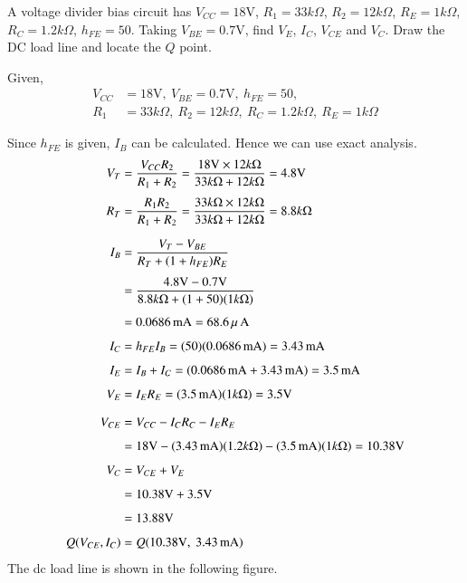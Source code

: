 \begin{example}\label{exam4.16}
A voltage divider bias circuit has $V_{CC}=18\text{V}$, $R_{1}=33 k\Omega$, $R_{2}=12 k\Omega$, $R_{E}=1 k\Omega$, $R_{C}=1.2 k\Omega$, $h_{FE}=50$. Taking $V_{BE}=0.7\text{V}$, find $V_{E}$, $I_{C}$, $V_{CE}$ and $V_{C}$. Draw the DC load line and locate the $Q$ point.
\end{example}

\begin{solution}
Given,
\begin{align*}
V_{CC} &= 18\text{V}, \ V_{BE}=0.7\text{V}, \ h_{FE}=50,\\[3pt]
R_{1} &= 33 k\Omega, \ R_{2}=12 k\Omega, \ R_{C}=1.2 k\Omega, \ R_{E}=1 k\Omega
\end{align*}

Since $h_{FE}$ is given, $I_{B}$ can be calculated. Hence we can use exact analysis.
\begin{align*}
V_{T} &= \frac{V_{CC}R_{2}}{R_{1}+R_{2}}=\frac{18\text{V}\times 12 k\Omega}{33 k\Omega +12 k\Omega}=4.8\text{V}\\[4pt]
R_{T} &= \frac{R_{1}R_{2}}{R_{1}+R_{2}}=\frac{33 k\Omega \times 12 k\Omega}{33 k\Omega + 12 k\Omega}=8.8 k\Omega\\[7pt]
I_{B} &= \frac{V_{T}-V_{BE}}{R_{T}+(1+h_{FE})R_{E}}\\[4pt]
&= \frac{4.8\text{V}-0.7\text{V}}{8.8 k\Omega+(1+50)(1 k\Omega)}\\[4pt]
&= 0.0686\text{\,mA}=68.6\,\mu\text{\,A}\\[4pt]
I_{C} &= h_{FE}I_{B}=(50)(0.0686\text{\,mA})=3.43\text{\,mA}\\[4pt]
I_{E} &= I_{B}+I_{C}=(0.0686\text{\,mA}+3.43\text{\,mA})=3.5\text{\,mA}\\[4pt]
V_{E} &= I_{E}R_{E}=(3.5\text{\,mA})(1 k\Omega)=3.5\text{V}\\[7pt]
V_{CE} &= V_{CC}-I_{C}R_{C}-I_{E}R_{E}\\[4pt]
&= 18\text{V}-(3.43\text{\,mA})(1.2 k\Omega)-(3.5\text{\,mA})(1 k\Omega)=10.38 \text{V}\\[4pt]
V_{C} &= V_{CE}+V_{E}\\[4pt]
&= 10.38\text{V}+3.5\text{V}\\[4pt]
&= 13.88\text{V}\\[4pt]
Q(V_{CE},I_{C}) &= Q(10.38\text{V}, \ 3.43\text{\,mA})
\end{align*}
The dc load line is shown in the following figure.
\begin{figure}[H]
\centering

\end{figure}
\end{solution}
